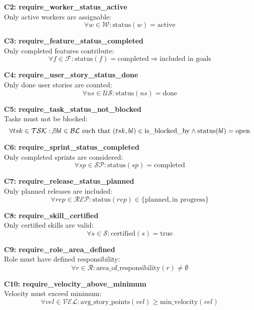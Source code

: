 \documentclass[12pt]{article}
\begin{document}
    \item \textbf{C2: require\_worker\_status\_active} \\
    Only active workers are assignable:
    \[
    \forall w \in \mathcal{W}: \text{status}(w) = \text{active}
    \]

    \item \textbf{C3: require\_feature\_status\_completed} \\
    Only completed features contribute:
    \[
    \forall f \in \mathcal{F}: \text{status}(f) = \text{completed} \Rightarrow \text{included in goals}
    \]

    \item \textbf{C4: require\_user\_story\_status\_done} \\
    Only done user stories are counted:
    \[
    \forall us \in \mathcal{US}: \text{status}(us) = \text{done}
    \]

    \item \textbf{C5: require\_task\_status\_not\_blocked} \\
    Tasks must not be blocked:
    \[
    \forall tsk \in \mathcal{TSK}: \not\exists bl \in \mathcal{BL} \text{ such that } (tsk, bl) \in \text{is\_blocked\_by} \land \text{status}(bl) = \text{open}
    \]

    \item \textbf{C6: require\_sprint\_status\_completed} \\
    Only completed sprints are considered:
    \[
    \forall sp \in \mathcal{SP}: \text{status}(sp) = \text{completed}
    \]

    \item \textbf{C7: require\_release\_status\_planned} \\
    Only planned releases are included:
    \[
    \forall rep \in \mathcal{REP}: \text{status}(rep) \in \{\text{planned}, \text{in progress}\}
    \]

    \item \textbf{C8: require\_skill\_certified} \\
    Only certified skills are valid:
    \[
    \forall s \in \mathcal{S}: \text{certified}(s) = \text{true}
    \]

    \item \textbf{C9: require\_role\_area\_defined} \\
    Role must have defined responsibility:
    \[
    \forall r \in \mathcal{R}: \text{area\_of\_responsibility}(r) \neq \emptyset
    \]

    \item \textbf{C10: require\_velocity\_above\_minimum} \\
    Velocity must exceed minimum:
    \[
    \forall vel \in \mathcal{VEL}: \text{avg\_story\_points}(vel) \geq \text{min\_velocity}(vel)
    \]
\end{document}
